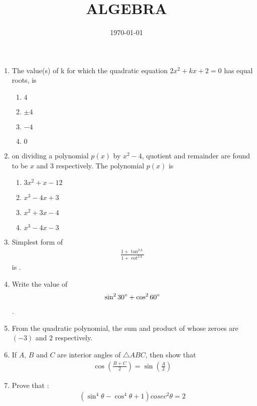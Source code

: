 \documentclass[12pt]{article}
\providecommand{\brak}[1]{\ensuremath{\left(#1\right)}}
\begin{document}
\title{ALGEBRA}
\date{ \today}
\maketitle
\begin{enumerate}

\item The value(s) of k for which the quadratic equation $2x^2 + kx + 2 = 0$ has equal roots, is 
\begin{enumerate}[label =(\Alph*)]
\item $4$ 
\item $\pm 4$
\item $-4$
\item $0$ 
\end{enumerate}

\item on dividing a polynomial $p(x)$ by $x^2 - 4$, 
quotient and remainder are found to be $x$ and $3$ 
respectively. The polynomial $p(x)$ is 
\begin{enumerate}[label =(\Alph*)]
\item $3x^2 + x - 12$
\item $x^3 - 4x + 3$
\item $x^2 + 3x - 4$
\item $x^3 - 4x - 3$
\end{enumerate}

\item Simplest form of 
 \begin{align*}
     \frac{1 + \tan^{2 A}}{1 + \cot^{2 A}}
 \end{align*}is .

\item Write the value of
 \begin{align*}
	     \sin^{2}{30\degree} + \cos^{2}{60\degree}
	\end{align*}.
\item From the quadratic polynomial, the sum and product  of whose zeroes are $(-3)$ and $2$ respectively.

\item If $A$, $B$ and $C$ are interior angles of $ \triangle ABC$, then show that
	\begin{align*}
	    \cos \brak{\frac{B + C}{2}}=\sin \brak{\frac{A}{2}}
	\end{align*}
      
\item Prove that : 
        \begin{align*}
           (\sin^4\theta - \cos^4\theta + 1)cosec^2\theta = 2 
        \end{align*}
  

\end{enumerate}
\end{document}
